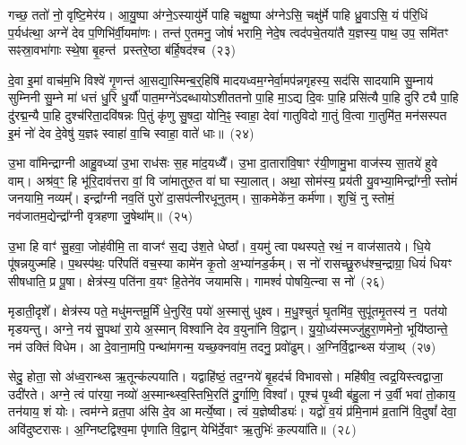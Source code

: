 गच्छ॒ ततो॑ नो॒ वृष्टि॒मेर॑य। आ॒यु॒ष्पा अ॑ग्ने॒\-ऽस्यायु॑र्मे पाहि चक्षु॒ष्पा अ॑ग्ने\-ऽसि॒ चक्षु॑र्मे पाहि ध्रु॒वा\-ऽसि॒ यं प॑रि॒धिं प॒र्यध॑त्था॒ अग्ने॑ देव प॒णिभि॑र्वी॒यमा॑णः। तन्त॑ ए॒तमनु॒ जोषं॑ भरामि॒ नेदे॒ष त्वद॑पचे॒तया॑तै य॒ज्ञस्य॒ पाथ॒ उप॒ समि॑तꣳ सꣴस्रा॒वभा॑गाः स्थे॒षा बृ॒हन्त॑ प्रस्तरे॒ष्ठा ब॑र्\mbox{}हि॒षद॑श्च~(२३)

दे॒वा इ॒मां वाच॑म॒भि विश्वे॑ गृ॒णन्त॑ आ॒सद्या॒स्मिन्ब॒र्॒हिषि॑ मादयध्वम॒ग्नेर्वा॒मप॑न्नगृहस्य॒ सद॑सि सादयामि सु॒म्नाय॑ सुम्निनी सु॒म्ने मा॑ धत्तं धु॒रि धु॒र्यौ॑ पात॒मग्ने॑\-ऽदब्धायो\-ऽशीततनो पा॒हि मा॒\-ऽद्य दि॒वः पा॒हि प्रसि॑त्यै पा॒हि दुरि॑ट्यै पा॒हि दु॑रद्म॒न्यै पा॒हि दुश्च॑रिता॒दवि॑षन्नः पि॒तुं कृ॑णु सु॒षदा॒ योनि॒ꣴ॒ स्वाहा॒ देवा॑ गातुविदो गा॒तुं वि॒त्वा गा॒तुमि॑त॒ मन॑सस्पत इ॒मं नो॑ देव दे॒वेषु॑ य॒ज्ञꣴ स्वाहा॑ वा॒चि स्वाहा॒ वाते॑ धाः॥~(२४)

{\anuvakamend[{दिव॑ञ्च वि॒त्वा गा॒तुन्त्रयो॑दश च}]}

उ॒भा वा॑मिन्द्राग्नी आहु॒वध्या॑ उ॒भा राध॑सः स॒ह मा॑द॒यध्यै᳚। उ॒भा दा॒तारा॑वि॒षाꣳ र॑यी॒णामु॒भा वाज॑स्य सा॒तये॑ हुवे वाम्। अश्र॑व॒ꣳ॒ हि भू॑रि॒दाव॑त्तरा वां॒ वि जा॑मातुरु॒त वा॑ घा स्या॒लात्। अथा॒ सोम॑स्य॒ प्रय॑ती यु॒वभ्या॒मिन्द्रा᳚ग्नी॒ स्तोमं॑ जनयामि॒ नव्यम्᳚। इन्द्रा᳚ग्नी नव॒तिं पुरो॑ दा॒सप॑त्नीरधूनुतम्। सा॒कमेके॑न॒ कर्म॑णा। शुचिं॒ नु स्तोमं॒ नव॑जातम॒द्येन्द्रा᳚ग्नी वृत्रहणा जु॒षेथा᳚म्॥~(२५)

उ॒भा हि वाꣳ॑ सु॒हवा॒ जोह॑वीमि॒ ता वाजꣳ॑ स॒द्य उ॑श॒ते धेष्ठा᳚। व॒यमु॑ त्वा पथस्पते॒ रथं॒ न वाज॑सातये। धि॒ये पू॑षन्नयुज्महि। प॒थस्प॑थः॒ परि॑पतिं वच॒स्या कामे॑न कृ॒तो अ॒भ्या॑नड॒र्कम्। स नो॑ रासच्छु॒रुध॑श्च॒न्द्राग्रा॒ धियं॑ धियꣳ सीषधाति॒ प्र पू॒षा। क्षेत्र॑स्य॒ पति॑ना व॒यꣳ हि॒तेने॑व जयामसि। गामश्वं॑ पोषयि॒त्न्वा स नो॑~(२६)

मृडाती॒दृशे᳚। क्षेत्र॑स्य पते॒ मधु॑मन्तमू॒र्मिं धे॒नुरि॑व॒ पयो॑ अ॒स्मासु॑ धुक्ष्व। म॒धु॒श्चुतं॑ घृ॒तमि॑व॒ सुपू॑तमृ॒तस्य॑ न॒ पत॑यो मृडयन्तु। अग्ने॒ नय॑ सु॒पथा॑ रा॒ये अ॒स्मान् विश्वा॑नि देव व॒युना॑नि वि॒द्वान्। यु॒यो॒ध्य॑स्मज्जु॑हुरा॒णमेनो॒ भूयि॑ष्ठान्ते॒ नम॑ उक्तिं विधेम। आ दे॒वाना॒मपि॒ पन्था॑मगन्म॒ यच्छ॒क्नवा॑म॒ तदनु॒ प्रवो॑ढुम्। अ॒ग्निर्वि॒द्वान्थ्स य॑जा॒थ्~(२७)

सेदु॒ होता॒ सो अ॑ध्व॒रान्थ्स ऋ॒तून्क॑ल्पयाति। यद्वा\-हि॑ष्ठं॒ तद॒ग्नये॑ बृ॒हद॑र्च विभावसो। महि॑षीव॒ त्वद्र॒यिस्त्वद्वाजा॒ उदी॑रते। अग्ने॒ त्वं पा॑रया॒ नव्यो॑ अ॒स्मान्थ्स्व॒स्तिभि॒रति॑ दु॒र्गाणि॒ विश्वा᳚। पूश्च॑ पृ॒थ्वी ब॑हु॒ला न॑ उ॒र्वी भवा॑ तो॒काय॒ तन॑याय॒ शं योः। त्वम॑ग्ने व्रत॒पा अ॑सि दे॒व आ मर्त्ये॒ष्वा। त्वं य॒ज्ञेष्वीड्यः॑। यद्वो॑ व॒यं प्र॑मि॒नाम॑ व्र॒तानि॑ वि॒दुषां᳚ देवा॒ अवि॑दुष्टरासः। अ॒ग्निष्टद्विश्व॒मा पृ॑णाति वि॒द्वान् येभि॑र्दे॒वाꣳ ऋ॒तुभिः॑ क॒ल्पया॑ति॥~(२८)

